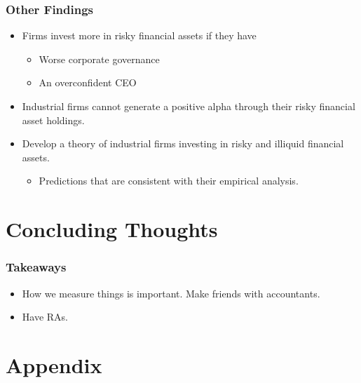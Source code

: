 \documentclass[handout]{beamer}
\begin{document}
\begin{frame}
\frametitle{Other Findings}
\begin{itemize}[<+->]
\item Firms invest more in risky financial assets if they have

\begin{itemize}[<+->]
\item Worse corporate governance
\item An overconfident CEO
\end{itemize}

\bigskip

\item Industrial firms cannot generate a positive alpha through their risky financial asset holdings.

\bigskip

\item Develop a theory of industrial firms investing in risky and illiquid financial assets.

\begin{itemize}
\item Predictions that are consistent with their empirical analysis.
\end{itemize}

\end{itemize}

\end{frame}


\section{Concluding Thoughts}




\begin{frame}
\frametitle{Takeaways}
\begin{itemize}[<+->]
\item How we measure things is important. Make friends with accountants.
\bigskip
\item Have RAs.

\end{itemize}
\end{frame}




\section{Appendix}
\end{document}
